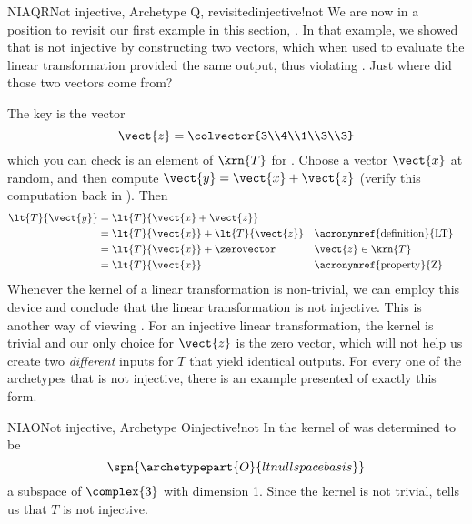 \begin{example}{NIAQR}{Not injective, Archetype Q, revisited}{injective!not}
We are now in a position to revisit our first example in this section, .  In that example, we showed that  is not injective by constructing two vectors, which when used to evaluate the linear transformation provided the same output, thus violating .  Just where did those two vectors come from?\par
%
The key is the vector
%
\begin{equation*}
\vect{z}=\colvector{3\\4\\1\\3\\3}
\end{equation*}
%
which you can check is an element of $\krn{T}$ for .  Choose a vector $\vect{x}$ at random, and then compute $\vect{y}=\vect{x}+\vect{z}$ (verify this computation back in ).  Then
%
\begin{align*}
\lt{T}{\vect{y}}&=\lt{T}{\vect{x}+\vect{z}}\\
&=\lt{T}{\vect{x}}+\lt{T}{\vect{z}}&&\text{\acronymref{definition}{LT}}\\
&=\lt{T}{\vect{x}}+\zerovector&&\vect{z}\in\krn{T}\\
&=\lt{T}{\vect{x}}&&\text{\acronymref{property}{Z}}
\end{align*}
%
Whenever the kernel of a linear transformation is non-trivial, we can employ this device and conclude that the linear transformation is not injective.  This is another way of viewing .  For an injective linear transformation, the kernel is trivial and our only choice for $\vect{z}$ is the zero vector, which will not help us create two {\em different} inputs for $T$ that yield identical outputs.  For every one of the archetypes that is not injective, there is an example presented of exactly this form.
%
\end{example}
%
\begin{example}{NIAO}{Not injective, Archetype O}{injective!not}
In  the kernel of  was determined to be
%
\begin{equation*}
\spn{\archetypepart{O}{ltnullspacebasis}}
\end{equation*}
%
a subspace of $\complex{3}$ with dimension 1.  Since the kernel is not trivial,  tells us that $T$ is not injective.
%
\end{example}
